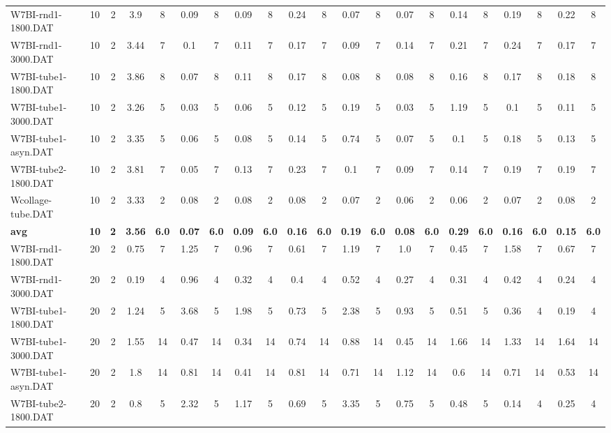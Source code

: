 \begin{sidewaystable}[!ht]
{\begin{tabular}{lcccccccccccccccccccc}
W7BI-rnd1-1800.DAT & 10 & 2 & 3.9 & 8 & 0.09 & 8 & 0.09 & 8 & 0.24 & 8 & 0.07 & 8 & 0.07 & 8 & 0.14 & 8 & 0.19 & 8 & 0.22 & 8 \\
W7BI-rnd1-3000.DAT & 10 & 2 & 3.44 & 7 & 0.1 & 7 & 0.11 & 7 & 0.17 & 7 & 0.09 & 7 & 0.14 & 7 & 0.21 & 7 & 0.24 & 7 & 0.17 & 7 \\
W7BI-tube1-1800.DAT & 10 & 2 & 3.86 & 8 & 0.07 & 8 & 0.11 & 8 & 0.17 & 8 & 0.08 & 8 & 0.08 & 8 & 0.16 & 8 & 0.17 & 8 & 0.18 & 8 \\
W7BI-tube1-3000.DAT & 10 & 2 & 3.26 & 5 & 0.03 & 5 & 0.06 & 5 & 0.12 & 5 & 0.19 & 5 & 0.03 & 5 & 1.19 & 5 & 0.1 & 5 & 0.11 & 5 \\
W7BI-tube1-asyn.DAT & 10 & 2 & 3.35 & 5 & 0.06 & 5 & 0.08 & 5 & 0.14 & 5 & 0.74 & 5 & 0.07 & 5 & 0.1 & 5 & 0.18 & 5 & 0.13 & 5 \\
W7BI-tube2-1800.DAT & 10 & 2 & 3.81 & 7 & 0.05 & 7 & 0.13 & 7 & 0.23 & 7 & 0.1 & 7 & 0.09 & 7 & 0.14 & 7 & 0.19 & 7 & 0.19 & 7 \\
Wcollage-tube.DAT & 10 & 2 & 3.33 & 2 & 0.08 & 2 & 0.08 & 2 & 0.08 & 2 & 0.07 & 2 & 0.06 & 2 & 0.06 & 2 & 0.07 & 2 & 0.08 & 2 \\
\cline{1-21} \textbf{avg} & \textbf{10} & \textbf{2} & \textbf{3.56} & \textbf{6.0} & \textbf{0.07} & \textbf{6.0} & \textbf{0.09} & \textbf{6.0} & \textbf{0.16} & \textbf{6.0} & \textbf{0.19} & \textbf{6.0} & \textbf{0.08} & \textbf{6.0} & \textbf{0.29} & \textbf{6.0} & \textbf{0.16} & \textbf{6.0} & \textbf{0.15} & \textbf{6.0} \\ \cline{1-21}
W7BI-rnd1-1800.DAT & 20 & 2 & 0.75 & 7 & 1.25 & 7 & 0.96 & 7 & 0.61 & 7 & 1.19 & 7 & 1.0 & 7 & 0.45 & 7 & 1.58 & 7 & 0.67 & 7 \\
W7BI-rnd1-3000.DAT & 20 & 2 & 0.19 & 4 & 0.96 & 4 & 0.32 & 4 & 0.4 & 4 & 0.52 & 4 & 0.27 & 4 & 0.31 & 4 & 0.42 & 4 & 0.24 & 4 \\
W7BI-tube1-1800.DAT & 20 & 2 & 1.24 & 5 & 3.68 & 5 & 1.98 & 5 & 0.73 & 5 & 2.38 & 5 & 0.93 & 5 & 0.51 & 5 & 0.36 & 4 & 0.19 & 4 \\
W7BI-tube1-3000.DAT & 20 & 2 & 1.55 & 14 & 0.47 & 14 & 0.34 & 14 & 0.74 & 14 & 0.88 & 14 & 0.45 & 14 & 1.66 & 14 & 1.33 & 14 & 1.64 & 14 \\
W7BI-tube1-asyn.DAT & 20 & 2 & 1.8 & 14 & 0.81 & 14 & 0.41 & 14 & 0.81 & 14 & 0.71 & 14 & 1.12 & 14 & 0.6 & 14 & 0.71 & 14 & 0.53 & 14 \\
W7BI-tube2-1800.DAT & 20 & 2 & 0.8 & 5 & 2.32 & 5 & 1.17 & 5 & 0.69 & 5 & 3.35 & 5 & 0.75 & 5 & 0.48 & 5 & 0.14 & 4 & 0.25 & 4 \\

\end{tabular}}
\end{sidewaystable}
